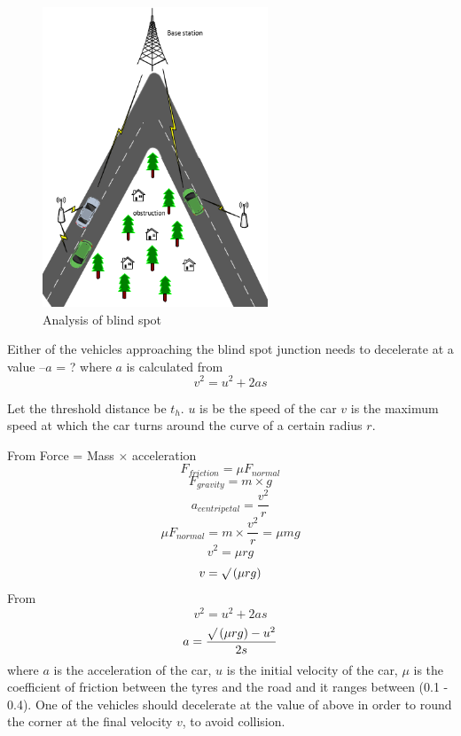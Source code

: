 \documentclass[12pt]{report}
\begin{document}
\begin{figure}[!hb]
\begin{center}
	\includegraphics[width=0.6\textwidth]{blindspot.png}
	\caption{Analysis of blind spot}
	\label{fig}
\end{center}
\end{figure}

Either of the vehicles approaching the blind spot junction needs to decelerate at a value $–a$ = ? where $a$ is calculated from 
\begin{equation}
	v^2 = u^2 + 2as
\end{equation}
 
Let the threshold distance be $t_h$.
$u$ is be the speed of the car
$v$ is the maximum speed at which the car turns around the curve of a certain radius $r$.

From Force = Mass $\times$ acceleration
\[F_{friction} = \mu F_{normal}\]
\begin{equation}
	F_{gravity} = m \times g
\end{equation}
\[a_{centripetal} = \frac{v^2}{r}\]
\[ \mu F_{normal} = m \times \frac{v^2}{r} = \mu mg\]
\[ v^2 = \mu rg\]
\begin{equation}
	v = \surd\left( \mu rg\right)
\end{equation}
From \[v^2 = u^2 + 2as\]
\begin{equation}
	a = \frac{\surd\left( \mu rg\right) - u^2}{2s}
\end{equation}
where $a$ is the acceleration of the car, $u$ is the initial velocity of the car, $\mu$ is the coefficient of friction between the tyres and the road and it ranges between (0.1 - 0.4). 
One of the vehicles should decelerate at the value of above in order to round the corner at the final velocity $v$, to avoid collision.
\end{document}

